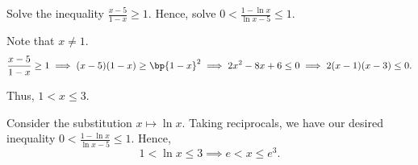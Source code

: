 \begin{problem}
    Solve the inequality $\frac{x-5}{1-x} \geq 1$. Hence, solve $0 < \frac{1-\ln x}{\ln x -5} \leq 1$.
\end{problem}
\begin{solution}
    Note that $x \neq 1$. \[\frac{x-5}{1-x} \geq 1 \implies  (x-5)(1-x) \geq \bp{1-x}^2 \implies 2x^2-8x+6 \leq 0 \implies 2(x-1)(x-3) \leq 0.\]

    \begin{center}
    \end{center}
    Thus, $1 < x \leq 3$.

    Consider the substitution $x \mapsto \ln x$. Taking reciprocals, we have our desired inequality $0 < \frac{1-\ln x}{\ln x -5} \leq 1$. Hence, \[1 < \ln x \leq 3 \implies e < x \leq e^3.\]
\end{solution}

